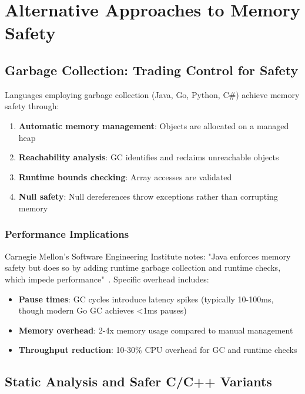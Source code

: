 \documentclass[11pt]{article}
\begin{document}
\section{Alternative Approaches to Memory Safety}

\subsection{Garbage Collection: Trading Control for Safety}

Languages employing garbage collection (Java, Go, Python, C\#) achieve memory safety through:

\begin{enumerate}
    \item \textbf{Automatic memory management}: Objects are allocated on a managed heap
    \item \textbf{Reachability analysis}: GC identifies and reclaims unreachable objects
    \item \textbf{Runtime bounds checking}: Array accesses are validated
    \item \textbf{Null safety}: Null dereferences throw exceptions rather than corrupting memory
\end{enumerate}

\subsubsection{Performance Implications}
Carnegie Mellon's Software Engineering Institute notes: "Java enforces memory safety but does so by adding runtime garbage collection and runtime checks, which impede performance"~\cite{sei2023rust}. Specific overhead includes:

\begin{itemize}
    \item \textbf{Pause times}: GC cycles introduce latency spikes (typically 10-100ms, though modern Go GC achieves <1ms pauses)
    \item \textbf{Memory overhead}: 2-4x memory usage compared to manual management
    \item \textbf{Throughput reduction}: 10-30\% CPU overhead for GC and runtime checks
\end{itemize}

\subsection{Static Analysis and Safer C/C++ Variants}
\end{document}
